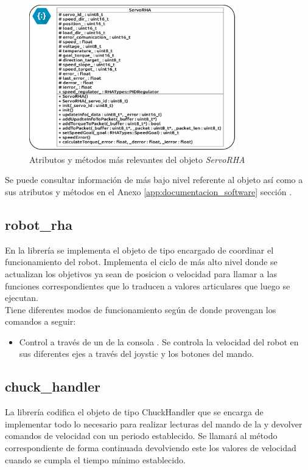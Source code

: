         \begin{figure}[H]
            \centering
            \includegraphics[width=0.8\textwidth]{figuras/Imagenes_SW/class_diagram_SRHA.jpg}
            \caption{Atributos y métodos más relevantes del objeto \textit{ServoRHA}}
            \label{fig:SW:class_diagram_SRHA}
        \end{figure}

        Se puede consultar información de más bajo nivel referente al objeto  así como a sus atributos y métodos en el Anexo \ref{app:documentacion_software} sección \completar.

    \subsection{robot\_rha} \label{subsec:SW:lib:robot_rha}
        En la librería  se implementa el objeto de tipo  encargado de coordinar el funcionamiento del robot. Implementa el ciclo de más alto nivel donde se actualizan los objetivos ya sean de posicion o velocidad para llamar a las funciones correspondientes que lo traducen a valores articulares que luego se ejecutan.
        \\

        Tiene diferentes modos de funcionamiento según de donde provengan los comandos a seguir:
        \begin{itemize}
            \item Control a través de un  de la consola . Se controla la velocidad del robot en sus diferentes ejes a través del joystic y los botones del mando.

        \end{itemize}

    \subsection{chuck\_handler} \label{subsec:SW:lib:chuck_handler}
        La librería  codifica el objeto de tipo ChuckHandler que se encarga de implementar todo lo necesario para realizar lecturas del mando  de la  y devolver comandos de velocidad con un periodo establecido. Se llamará al método correspondiente de forma continuada devolviendo este los valores de velocidad cuando se cumpla el tiempo mínimo establecido.

